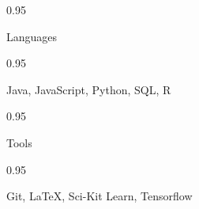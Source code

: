 \documentclass[a4paper,9pt]{article}
\newcommand{\doubleColumnGap}{\hspace{4mm}}
\newcommand{\withinSectionMarginBetween}{\vspace{-3ex}}
\newcommand{\mainLineSpacing}{0.95}
\begin{document}
\withinSectionMarginBetween{}

\begin{minipage}[t]{0.20\linewidth}
  \begin{small}
    \begin{spacing}\mainLineSpacing{}
      \begin{flushright}
        Languages
      \end{flushright}
    \end{spacing}
  \end{small}
\end{minipage}
\doubleColumnGap{}
\begin{minipage}[t]{0.75\linewidth}
  \begin{small}
    \begin{spacing}\mainLineSpacing{}
      \begin{flushleft}
        Java, JavaScript, Python, SQL, R
      \end{flushleft}
    \end{spacing}
  \end{small}
\end{minipage}


\withinSectionMarginBetween{}

\begin{minipage}[t]{0.20\linewidth}
  \begin{small}
    \begin{spacing}\mainLineSpacing{}
      \begin{flushright}
        Tools
      \end{flushright}
    \end{spacing}
  \end{small}
\end{minipage}
\doubleColumnGap{}
\begin{minipage}[t]{0.75\linewidth}
  \begin{small}
    \begin{spacing}\mainLineSpacing{}
      \begin{flushleft}
        Git, \LaTeX, Sci-Kit Learn, Tensorflow
      \end{flushleft}
    \end{spacing}
  \end{small}
\end{minipage}
\end{document}
